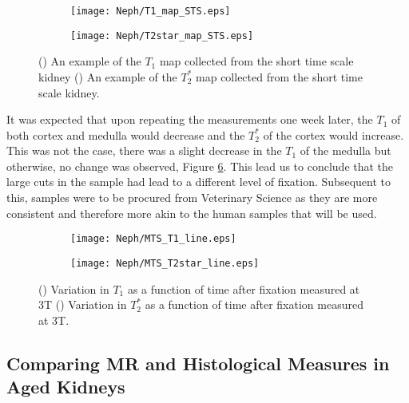 \begin{figure}[H]
	\centering
	\begin{subfigure}[c]{0.47\textwidth}
		\centering
		\texttt{[image: Neph/T1\_map\_STS.eps]}
		\caption{}
		\label{fig:fixation_t1map_3t_sts}
	\end{subfigure}
	\hfill
	\begin{subfigure}[c]{0.47\textwidth}
		\centering
		\texttt{[image: Neph/T2star\_map\_STS.eps]}
		\caption{}
		\label{fig:fixation_t2starmap_3t_sts}
	\end{subfigure}
	\caption{() An example of the $T_1$ map collected from the short time scale kidney () An example of the $T_2^*$ map collected from the short time scale kidney.}
	\label{fig:neph_maps_sts}
\end{figure}

It was expected that upon repeating the measurements one week later, the $T_1$ of both cortex and medulla would decrease and the $T_2^*$ of the cortex would increase. This was not the case, there was a slight decrease in the $T_1$ of the medulla but otherwise, no change was observed, Figure \ref{fig:fixation_mts}. This lead us to conclude that the large cuts in the sample had lead to a different level of fixation. Subsequent to this, samples were to be procured from Veterinary Science as they are more consistent and therefore more akin to the human samples that will be used.

\begin{figure}[H]
	\centering
	\begin{subfigure}[c]{0.47\textwidth}
		\centering
		\texttt{[image: Neph/MTS\_T1\_line.eps]}
		\caption{}
		\label{fig:fixation_t1_3t_mts}
	\end{subfigure}
	\hfill
	\begin{subfigure}[c]{0.47\textwidth}
		\centering
		\texttt{[image: Neph/MTS\_T2star\_line.eps]}
		\caption{}
		\label{fig:fixation_t2star_3t_mts}
	\end{subfigure}
	\caption{() Variation in $T_1$ as a function of time after fixation measured at 3T () Variation in $T_2^*$ as a function of time after fixation measured at 3T.}
	\label{fig:fixation_mts}
\end{figure}

\subsection{Comparing MR and Histological Measures in Aged Kidneys}

